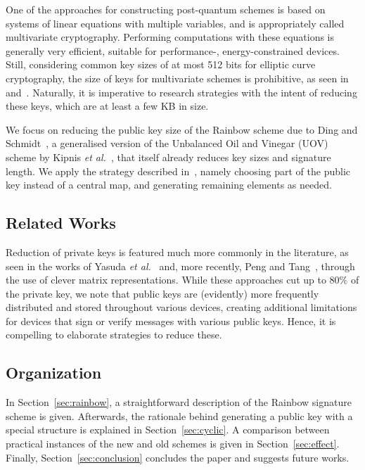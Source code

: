 \documentclass[a4paper, 14pt]{extarticle}
\begin{document}
One of the approaches for constructing post-quantum schemes is based on systems of linear equations with multiple variables, and is appropriately called multivariate cryptography. Performing computations with these equations is generally very efficient, suitable for performance-, energy-constrained devices. Still, considering common key sizes of at most 512 bits for elliptic curve cryptography, the size of keys for multivariate schemes is prohibitive, as seen in~\cite[Table 6.4]{Petzoldt:phd:2013:jul} and~\cite[Table 1]{Ding:article:2017:jul}. Naturally, it is imperative to research strategies with the intent of reducing these keys, which are at least a few KB in size.

We focus on reducing the public key size of the Rainbow scheme due to Ding and Schmidt~\cite{Ding:inproc:2005:jun}, a generalised version of the Unbalanced Oil and Vinegar (UOV) scheme by Kipnis \emph{et al.}~\cite{Kipnis:inproc:1999:apr}, that itself already reduces key sizes and signature length. We apply the strategy described in~\cite[Chapter 7]{Petzoldt:phd:2013:jul}, namely choosing part of the public key instead of a central map, and generating remaining elements as needed.

\subsection{Related Works}
Reduction of private keys is featured much more commonly in the literature, as seen in the works of Yasuda \emph{et al.}~\cite{Yasuda:inproc:2013:may, Yasuda:inproc:2014:apr, Yasuda:article:2014:sep} and, more recently, Peng and Tang~\cite{Peng:article:2017:jun}, through the use of clever matrix representations. While these approaches cut up to $80\%$ of the private key, we note that public keys are (evidently) more frequently distributed and stored throughout various devices, creating additional limitations for devices that sign or verify messages with various public keys. Hence, it is compelling to elaborate strategies to reduce these.

\subsection{Organization}
In Section~\ref{sec:rainbow}, a straightforward description of the Rainbow signature scheme is given. Afterwards, the rationale behind generating a public key with a special structure is explained in Section~\ref{sec:cyclic}. A comparison between practical instances of the new and old schemes is given in Section~\ref{sec:effect}. Finally, Section~\ref{sec:conclusion} concludes the paper and suggests future works.
\end{document}
